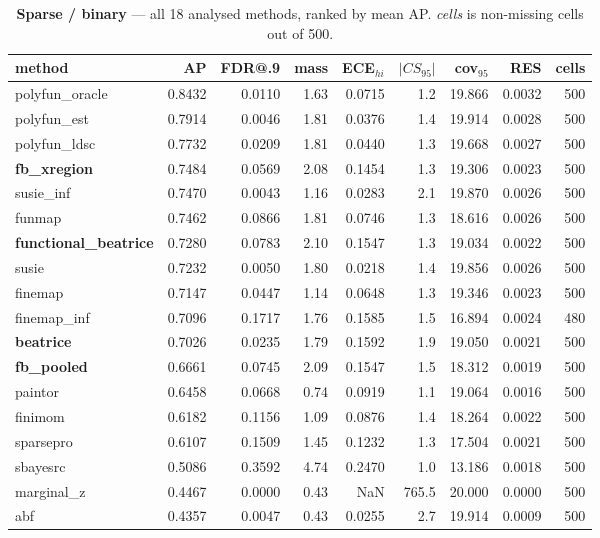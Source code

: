 \begin{table}[htbp]\centering\small
\caption{\textbf{Sparse / binary} --- all 18 analysed methods, ranked by mean AP. \emph{cells} is non-missing cells out of 500.}
\label{tab:main-sparse-binary}
\begin{tabular}{lrrrrrrr r}\toprule
method & AP & FDR@.9 & mass & ECE$_{hi}$ & $|CS_{95}|$ & cov$_{95}$ & RES & cells\\\midrule
polyfun\_oracle & 0.8432 & 0.0110 & 1.63 & 0.0715 & 1.2 & 19.866 & 0.0032 & 500\\
polyfun\_est & 0.7914 & 0.0046 & 1.81 & 0.0376 & 1.4 & 19.914 & 0.0028 & 500\\
polyfun\_ldsc & 0.7732 & 0.0209 & 1.81 & 0.0440 & 1.3 & 19.668 & 0.0027 & 500\\
\textbf{fb\_xregion} & 0.7484 & 0.0569 & 2.08 & 0.1454 & 1.3 & 19.306 & 0.0023 & 500\\
susie\_inf & 0.7470 & 0.0043 & 1.16 & 0.0283 & 2.1 & 19.870 & 0.0026 & 500\\
funmap & 0.7462 & 0.0866 & 1.81 & 0.0746 & 1.3 & 18.616 & 0.0026 & 500\\
\textbf{functional\_beatrice} & 0.7280 & 0.0783 & 2.10 & 0.1547 & 1.3 & 19.034 & 0.0022 & 500\\
susie & 0.7232 & 0.0050 & 1.80 & 0.0218 & 1.4 & 19.856 & 0.0026 & 500\\
finemap & 0.7147 & 0.0447 & 1.14 & 0.0648 & 1.3 & 19.346 & 0.0023 & 500\\
finemap\_inf & 0.7096 & 0.1717 & 1.76 & 0.1585 & 1.5 & 16.894 & 0.0024 & 480\\
\textbf{beatrice} & 0.7026 & 0.0235 & 1.79 & 0.1592 & 1.9 & 19.050 & 0.0021 & 500\\
\textbf{fb\_pooled} & 0.6661 & 0.0745 & 2.09 & 0.1547 & 1.5 & 18.312 & 0.0019 & 500\\
paintor & 0.6458 & 0.0668 & 0.74 & 0.0919 & 1.1 & 19.064 & 0.0016 & 500\\
finimom & 0.6182 & 0.1156 & 1.09 & 0.0876 & 1.4 & 18.264 & 0.0022 & 500\\
sparsepro & 0.6107 & 0.1509 & 1.45 & 0.1232 & 1.3 & 17.504 & 0.0021 & 500\\
sbayesrc & 0.5086 & 0.3592 & 4.74 & 0.2470 & 1.0 & 13.186 & 0.0018 & 500\\
marginal\_z & 0.4467 & 0.0000 & 0.43 & NaN & 765.5 & 20.000 & 0.0000 & 500\\
abf & 0.4357 & 0.0047 & 0.43 & 0.0255 & 2.7 & 19.914 & 0.0009 & 500\\
\bottomrule\end{tabular}\end{table}
